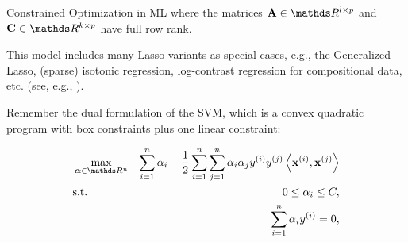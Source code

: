 \documentclass[11pt,compress,t,notes=noshow, xcolor=table]{beamer}
\begin{document}
\begin{vbframe}{Constrained Optimization in ML}
where the matrices $\Amat\in \R^{l \times p}$ and $\mathbf{C} \in \R^{k \times p}$ have full row rank. 
\lz 

This model includes many Lasso variants as special cases, e.g., the Generalized Lasso, (sparse) isotonic regression, log-contrast regression for compositional data, etc. (see, e.g., \href{https://hua-zhou.github.io/media/pdf/GainesKimZhou08CLasso.pdf}{}). 

\framebreak

Remember the dual formulation of the SVM, which is a convex quadratic program with box constraints plus one linear constraint: 

\begin{eqnarray*}
	& \max\limits_{\boldsymbol{\alpha} \in \R^n} & \sum_{i=1}^n \alpha_i - \frac{1}{2}\sum_{i=1}^n\sum_{j=1}^n\alpha_i\alpha_j\yi y^{(j)} \scp{\xi}{\xv^{(j)}} \\
	& \text{s.t. } & 0 \le \alpha_i \le C, \\
	& \quad & \sum_{i=1}^n \alpha_i \yi = 0,
\end{eqnarray*}

%
%
%
%
%
%
%
%
%
%
%
%
%
%
%
%
%
%

\end{vbframe}
\end{document}
